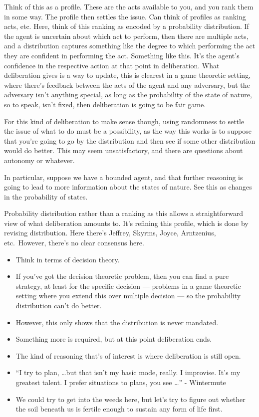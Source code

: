 \documentclass[10pt]{article}
\begin{document}
Think of this as a profile.
These are the acts available to you, and you rank them in some way.
The profile then settles the issue.
Can think of profiles as ranking acts, etc.
Here, think of this ranking as encoded by a probability distribution.
If the agent is uncertain about which act to perform, then there are multiple acts, and a distribution captures something like the degree to which performing the act they are confident in performing the act.
Something like this.
It's the agent's confidence in the respective action at that point in deliberation.
What deliberation gives is a way to update, this is clearest in a game theoretic setting, where there's feedback between the acts of the agent and any adversary, but the adversary isn't anything special, as long as the probability of the state of nature, so to speak, isn't fixed, then deliberation is going to be fair game.

For this kind of deliberation to make sense though, using randomness to settle the issue of what to do must be a possibility, as the way this works is to suppose that you're going to go by the distribution and then see if some other distribution would do better.
This may seem unsatisfactory, and there are questions about autonomy or whatever.


In particular, suppose we have a bounded agent, and that further reasoning is going to lead to more information about the states of nature.
See this as changes in the probability of states.




Probability distribution rather than a ranking as this allows a straightforward view of what deliberation amounts to.
It's refining this profile, which is done by revising distribution.
Here there's Jeffrey, Skyrms, Joyce, Arntzenius, etc.\
However, there's no clear consensus here.
\begin{itemize}
\item Think in terms of decision theory.
\item If you've got the decision theoretic problem, then you can find a pure strategy, at least for the specific decision --- problems in a game theoretic setting where you extend this over multiple decision --- so the probability distribution can't do better.
\item However, this only shows that the distribution is never mandated.
\item Something more is required, but at this point deliberation ends.
\item The kind of reasoning that's of interest is where deliberation is still open.
\item ``I try to plan, \dots but that isn't my basic mode, really.
  I improvise.
  It’s my greatest talent.
  I prefer situations to plans, you see \dots'' - Wintermute
\item We could try to get into the weeds here, but let's try to figure out whether the soil beneath us is fertile enough to sustain any form of life first.
\end{itemize}
\end{document}

